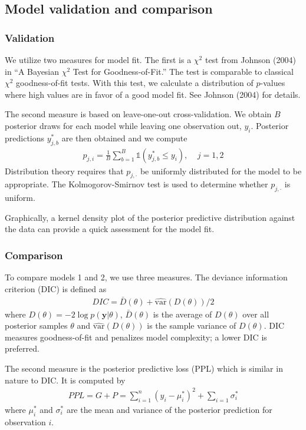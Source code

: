 \documentclass{asaproc}
\newcommand{\m}[1]{\mathbf{\bm{#1}}}
\begin{document}
\subsection{Model validation and comparison}

\subsubsection{Validation}

We utilize two measures for model fit. The first is a $\chi^2$ test from Johnson (2004) in ``A Bayesian $\chi^2$ Test for Goodness-of-Fit.'' The test is comparable to classical $\chi^2$ goodness-of-fit tests. With this test, we calculate a distribution of $p$-values where high values are in favor of a good model fit. See Johnson (2004) for details.

The second measure is based on leave-one-out cross-validation. We obtain $B$ posterior draws for each model while leaving one observation out, $y_i$. Posterior predictions $y_{j,b}^*$ are then obtained and we compute
\begin{eqnarray*}
p_{j,i}=\frac{1}{B}\sum_{b=1}^B \mathds{1}(y_{j,b}^* \leq y_i),~~~~~j=1,2
\end{eqnarray*}
Distribution theory requires that $p_{j,\cdot}$ be uniformly distributed for the model to be appropriate. The Kolmogorov-Smirnov test is used to determine whether $p_{j,\cdot}$ is uniform.

Graphically, a kernel density plot of the posterior predictive distribution against the data can provide a quick assessment for the model fit.

\subsubsection{Comparison}

To compare models 1 and 2, we use three measures. The deviance information criterion (DIC) is defined as
\begin{eqnarray*}
DIC=\bar{D}(\theta)+\widehat{\mathrm{var}}(D(\theta))/2
\end{eqnarray*}
where $D(\theta)=-2\log p(\m{y}|\theta)$, $\bar{D}(\theta)$ is the average of $D(\theta)$ over all posterior samples $\theta$ and $\widehat{\mathrm{var}}(D(\theta))$ is the sample variance of $D(\theta)$. DIC measures goodness-of-fit and penalizes model complexity; a lower DIC is preferred.

The second measure is the posterior predictive loss (PPL) which is similar in nature to DIC. It is computed by
\begin{eqnarray*}
PPL=G+P=\sum_{i=1}^n(y_i-\mu_i^*)^2 + \sum_{i=1}\sigma_i^*
\end{eqnarray*}
where $\mu_i^*$ and $\sigma_i^*$ are the mean and variance of the posterior prediction for observation $i$.
\end{document}
